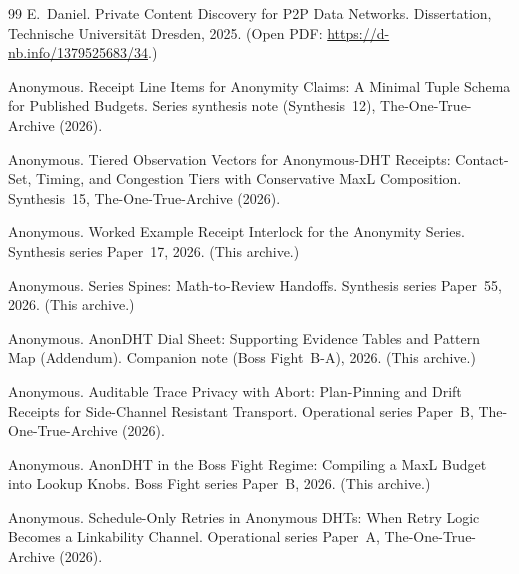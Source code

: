\documentclass[11pt]{article}
\begin{document}
\begin{thebibliography}{99}
E.~Daniel.
\newblock Private Content Discovery for P2P Data Networks.
\newblock Dissertation, Technische Universit\"at Dresden, 2025.
\newblock (Open PDF: \url{https://d-nb.info/1379525683/34}.)

Anonymous.
\newblock Receipt Line Items for Anonymity Claims: A Minimal Tuple Schema for Published Budgets.
\newblock Series synthesis note (Synthesis~12), The-One-True-Archive (2026).


Anonymous.
\newblock Tiered Observation Vectors for Anonymous-DHT Receipts: Contact-Set, Timing, and Congestion Tiers with Conservative MaxL Composition.
\newblock Synthesis~15, The-One-True-Archive (2026).

Anonymous.
\newblock Worked Example Receipt Interlock for the Anonymity Series.
\newblock Synthesis series Paper~17, 2026. (This archive.)

Anonymous.
\newblock Series Spines: Math-to-Review Handoffs.
\newblock Synthesis series Paper~55, 2026. (This archive.)

Anonymous.
\newblock AnonDHT Dial Sheet: Supporting Evidence Tables and Pattern Map (Addendum).
\newblock Companion note (Boss Fight~B-A), 2026. (This archive.)



Anonymous.
\newblock Auditable Trace Privacy with Abort: Plan-Pinning and Drift Receipts for Side-Channel Resistant Transport.
\newblock Operational series Paper~B, The-One-True-Archive (2026).

Anonymous.
\newblock AnonDHT in the Boss Fight Regime: Compiling a MaxL Budget into Lookup Knobs.
\newblock Boss Fight series Paper~B, 2026. (This archive.)

Anonymous.
\newblock Schedule-Only Retries in Anonymous DHTs: When Retry Logic Becomes a Linkability Channel.
\newblock Operational series Paper~A, The-One-True-Archive (2026).

\end{thebibliography}
\end{document}
